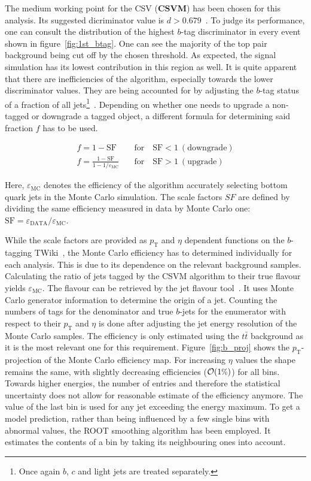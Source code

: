 The medium working point for the CSV (\textbf{CSVM}) has been chosen for this analysis. Its suggested dicriminator value is $d > 0.679$~\cite{btagworkp}. To judge its performance, one can consult the distribution of the highest $b$-tag discriminator in every event shown in figure~\ref{fig:1st_btag}. One can see the majority of the top pair background being cut off by the chosen threshold. As expected, the signal simulation has its lowest contribution in this region as well. It is quite apparent that there are inefficiencies of the algorithm, especially towards the lower discriminator values. They are being accounted for by adjusting the $b$-tag status of a fraction of all jets\footnote{Once again $b$, $c$ and light jets are treated separately.}~\cite{btageff}. Depending on whether one needs to upgrade a non-tagged or downgrade a tagged object, a different formula for determining said fraction $f$ has to be used.

\begin{align}
  \label{eq:btagsf}
  f = 1 - \text{SF} \quad & \text{for} \quad \text{SF} < 1\:(\text{downgrade}) \\
  f = \frac{1 - \text{SF}}{1- 1/\varepsilon_{\text{MC}}} \quad & \text{for} \quad \text{SF} > 1\:(\text{upgrade})
\end{align}

\noindent Here, $\varepsilon_{\text{MC}}$ denotes the efficiency of the algorithm accurately selecting bottom quark jets in the Monte Carlo simulation. The scale factors $SF$ are defined by dividing the same efficiency measured in data by Monte Carlo one: $\text{SF} = \varepsilon_{\text{DATA}} / \varepsilon_{\text{MC}}$.

While the scale factors are provided as $p_{\text{T}}$ and $\eta$ dependent functions on the $b$-tagging TWiki~\cite{btagtwiki}, the Monte Carlo efficiency has to determined individually for each analysis. This is due to its dependence on the relevant background samples. Calculating the ratio of jets tagged by the CSVM algorithm to their true flavour yields $\varepsilon_{\text{MC}}$. The flavour can be retrieved by the jet flavour tool~\cite{jetflavtool}. It uses Monte Carlo generator information to determine the origin of a jet. Counting the numbers of tags for the denominator and true $b$-jets for the enumerator with respect to their $p_{\text{T}}$ and $\eta$ is done after adjusting the jet energy resolution of the Monte Carlo samples. The efficiency is only estimated using the $t\bar{t}$ background as it is the most relevant one for this requirement. Figure~\ref{fig:b_proj} shows the $p_{\text{T}}$-projection of the Monte Carlo efficiency map. For increasing $\eta$ values the shape remains the same, with slightly decreasing efficiencies ($\mathcal{O}(1\pct)$) for all bins. Towards higher energies, the number of entries and therefore the statistical uncertainty does not allow for reasonable estimate of the efficiency anymore. The value of the last bin is used for any jet exceeding the energy maximum. To get a model prediction, rather than being influenced by a few single bins with abnormal values, the \textsc{ROOT} smoothing algorithm has been employed. It estimates the contents of a bin by taking its neighbouring ones into account.

